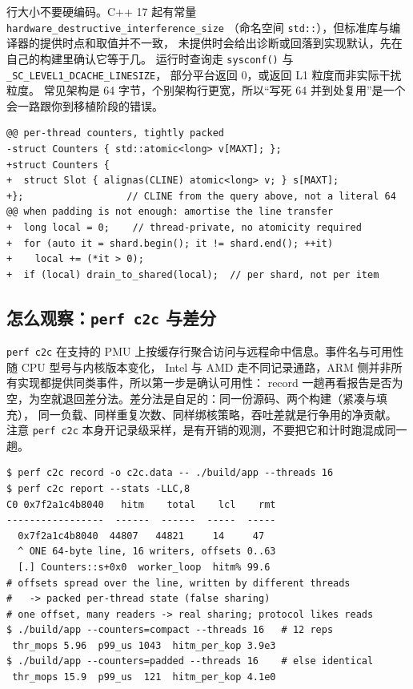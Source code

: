\documentclass[12pt,a4paper,fontset=fandol]{ctexbook}
\newcommand{\Fn}[1]{\texttt{#1()}}
\newcommand{\Tp}[1]{\texttt{#1}}
\newcommand{\Bk}{\discretionary{}{}{}}
\newcommand{\Lang}[1]{\textsf{#1}}
\newcommand{\CPP}{\Lang{C++}}
\begin{document}
行大小不要硬编码。\CPP{} 17 起有常量 \Tp{hardware{\Bk}\_destructive{\Bk}\_interference{\Bk}\_size}
（命名空间 \Tp{std::}），但标准库与编译器的提供时点和取值并不一致，
未提供时会给出诊断或回落到实现默认，先在自己的构建里确认它等于几。
运行时查询走 \Fn{sysconf} 与 \Tp{\_SC{\Bk}\_LEVEL1{\Bk}\_DCACHE{\Bk}\_LINESIZE}，
部分平台返回 0，或返回 L1 粒度而非实际干扰粒度。
常见架构是 64 字节，个别架构行更宽，所以``写死 64 并到处复用''是一个会一路跟你到移植阶段的错误。

\begin{lstlisting}[style=diffstyle, label={lst:pm09-pad},
caption={两种修法的形式示例（差异格式示意，非本仓库实测）。}]
@@ per-thread counters, tightly packed
-struct Counters { std::atomic<long> v[MAXT]; };
+struct Counters {
+  struct Slot { alignas(CLINE) atomic<long> v; } s[MAXT];
+};                  // CLINE from the query above, not a literal 64
@@ when padding is not enough: amortise the line transfer
+  long local = 0;    // thread-private, no atomicity required
+  for (auto it = shard.begin(); it != shard.end(); ++it)
+    local += (*it > 0);
+  if (local) drain_to_shared(local);  // per shard, not per item
\end{lstlisting}

\subsection{怎么观察：\Tp{perf c2c} 与差分}

\Tp{perf c2c} 在支持的 PMU 上按缓存行聚合访问与远程命中信息。事件名与可用性随 CPU 型号与内核版本变化，
Intel 与 AMD 走不同记录通路，ARM 侧并非所有实现都提供同类事件，所以第一步是确认可用性：
record 一趟再看报告是否为空，为空就退回差分法。差分法是自足的：同一份源码、两个构建（紧凑与填充），
同一负载、同样重复次数、同样绑核策略，吞吐差就是行争用的净贡献。
注意 \Tp{perf c2c} 本身开记录级采样，是有开销的观测，不要把它和计时跑混成同一趟。

\begin{lstlisting}[style=outstyle, label={lst:pm09-c2c},
caption={\Tp{perf c2c report} 关键片段与差分跑的示意输出/格式示例（非本仓库实测值）。}]
$ perf c2c record -o c2c.data -- ./build/app --threads 16
$ perf c2c report --stats -LLC,8
C0 0x7f2a1c4b8040   hitm    total    lcl    rmt
-----------------  ------  ------  -----  -----
  0x7f2a1c4b8040  44807   44821     14     47
  ^ ONE 64-byte line, 16 writers, offsets 0..63
  [.] Counters::s+0x0  worker_loop  hitm% 99.6
# offsets spread over the line, written by different threads
#   -> packed per-thread state (false sharing)
# one offset, many readers -> real sharing; protocol likes reads
$ ./build/app --counters=compact --threads 16   # 12 reps
 thr_mops 5.96  p99_us 1043  hitm_per_kop 3.9e3
$ ./build/app --counters=padded --threads 16    # else identical
 thr_mops 15.9  p99_us  121  hitm_per_kop 4.1e0
\end{lstlisting}
\end{document}
